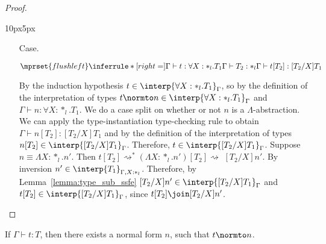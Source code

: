 \begin{proof}
\begin{changemargin}{10px}{5px}
\begin{itemize}
\item[Case.]\ \\
  \begin{center}
    \begin{math}
      $$\mprset{flushleft}
      \inferrule* [right=] {
        \Gamma \vdash t:\forall X:*_l.T_1
        \\
        \Gamma \vdash T_2:*_l
      }{\Gamma \vdash t[T_2]: [T_2/X]T_1}
    \end{math}
  \end{center}
  By the induction hypothesis $t \in \interp{\forall X:*_l.T_1}_\Gamma$, so by the 
  definition of the interpretation of types 
  $t \normto n \in \interp{\forall X:*_l.T_1}_\Gamma$ and
  $\Gamma \vdash n:\forall X:*_l.T_1$.  We do a case 
  split on whether or not $n$ is a $\Lambda$-abstraction. We can apply the
  type-instantiation type-checking rule to obtain 
  $\Gamma \vdash n[T_2]:[T_2/X]T_1$ and by the 
  definition of the interpretation of types 
  $n[T_2] \in \interp{[T_2/X]T_1}_\Gamma$. Therefore, 
  $t \in \interp{[T_2/X]T_1}_\Gamma$.  Suppose $n \equiv \Lambda X:*_l.n'$.  
  Then 
  $t[T_2] \rightsquigarrow^{*} (\Lambda X:*_l.n')[T_2] \rightsquigarrow $
  $ [T_2/X]n'$.  By inversion
  $n' \in \interp{T_1}_{\Gamma,X:*_l}$. Therefore, by
  Lemma~\ref{lemma:type_sub_ssfe} $[T_2/X]n' \in \interp{[T_2/X]T_1}_{\Gamma}$ and
  $t[T_2] \in \interp{[T_2/X]T_1}_{\Gamma}$, since $t[T_2] \join [T_2/X]n'$.
\end{itemize}
\end{changemargin}
\end{proof}
\begin{corollary}[Normalization]
  If $\Gamma \vdash t:T$, then there exists a normal form $n$, such
  that $t \normto n$.
\end{corollary}

